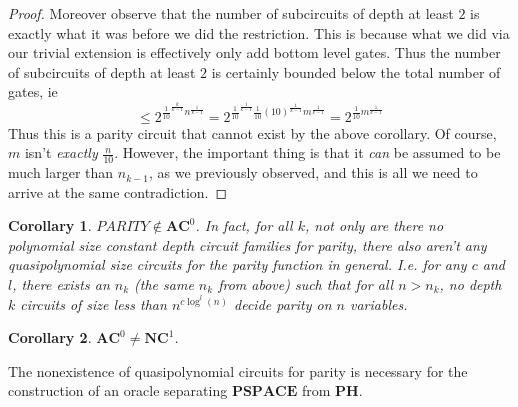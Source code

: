 \documentclass{article}
\theoremstyle{definition}
\theoremstyle{plain}
\theoremstyle{theorem}
\newtheorem{corollary}{Corollary}[section]
\begin{document}
\begin{proof}
Moreover observe that the number of subcircuits of depth at least $2$ is exactly what it was before we did the restriction. This is because what we did via our trivial extension is effectively only add bottom level gates. Thus the number of subcircuits of depth at least $2$ is certainly bounded below the total number of gates, ie
\[ \leq 2^{\frac{1}{10}^{\frac{k}{k-1}}n^{\frac{1}{k-1}}} = 2^{\frac{1}{10}^{\frac{1}{k-1}}\frac{1}{10}(10)^{\frac{1}{k-1}}m^{\frac{1}{k-1}}} = 2^{\frac{1}{10}m^{\frac{1}{k-1}}} \]
Thus this is a parity circuit that cannot exist by the above corollary. Of course, $m$ isn't \emph{exactly} $\frac{n}{10}$. However, the important thing is that it \emph{can} be assumed to be much larger than $n_{k-1}$, as we previously observed, and this is all we need to arrive at the same contradiction.	
\end{proof}
\begin{corollary}
	$PARITY \notin \bm{AC}^0$. In fact, for all $k$, not only are there no polynomial size constant depth circuit families for parity, there also aren't any quasipolynomial size circuits for the parity function in general. I.e. for any $c$ and $l$, there exists an $n_k$ (the same $n_k$ from above) such that for all $n > n_k$, no depth $k$ circuits of size less than $n^{c\log^l(n)}$ decide parity on $n$ variables.
\end{corollary}
\begin{corollary}
	$\bm{AC}^0 \neq \bm{NC}^1$.
\end{corollary}
The nonexistence of quasipolynomial circuits for parity is necessary for the construction of an oracle separating $\bm{PSPACE}$ from $\bm{PH}$. 
\end{document}
